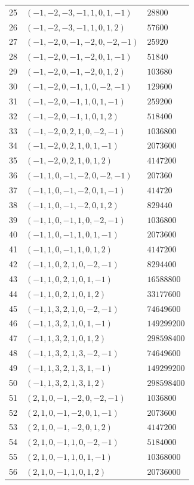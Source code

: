 \begin{longtable}{@{}rll@{}}
25 & $(-1,-2,-3,-1,1,0,1,-1)$ & $28800$\\
26 & $(-1,-2,-3,-1,1,0,1,2)$ & $57600$\\
27 & $(-1,-2,0,-1,-2,0,-2,-1)$ & $25920$\\
28 & $(-1,-2,0,-1,-2,0,1,-1)$ & $51840$\\
29 & $(-1,-2,0,-1,-2,0,1,2)$ & $103680$\\
30 & $(-1,-2,0,-1,1,0,-2,-1)$ & $129600$\\
31 & $(-1,-2,0,-1,1,0,1,-1)$ & $259200$\\
32 & $(-1,-2,0,-1,1,0,1,2)$ & $518400$\\
33 & $(-1,-2,0,2,1,0,-2,-1)$ & $1036800$\\
34 & $(-1,-2,0,2,1,0,1,-1)$ & $2073600$\\
35 & $(-1,-2,0,2,1,0,1,2)$ & $4147200$\\
36 & $(-1,1,0,-1,-2,0,-2,-1)$ & $207360$\\
37 & $(-1,1,0,-1,-2,0,1,-1)$ & $414720$\\
38 & $(-1,1,0,-1,-2,0,1,2)$ & $829440$\\
39 & $(-1,1,0,-1,1,0,-2,-1)$ & $1036800$\\
40 & $(-1,1,0,-1,1,0,1,-1)$ & $2073600$\\
41 & $(-1,1,0,-1,1,0,1,2)$ & $4147200$\\
42 & $(-1,1,0,2,1,0,-2,-1)$ & $8294400$\\
43 & $(-1,1,0,2,1,0,1,-1)$ & $16588800$\\
44 & $(-1,1,0,2,1,0,1,2)$ & $33177600$\\
45 & $(-1,1,3,2,1,0,-2,-1)$ & $74649600$\\
46 & $(-1,1,3,2,1,0,1,-1)$ & $149299200$\\
47 & $(-1,1,3,2,1,0,1,2)$ & $298598400$\\
48 & $(-1,1,3,2,1,3,-2,-1)$ & $74649600$\\
49 & $(-1,1,3,2,1,3,1,-1)$ & $149299200$\\
50 & $(-1,1,3,2,1,3,1,2)$ & $298598400$\\
51 & $(2,1,0,-1,-2,0,-2,-1)$ & $1036800$\\
52 & $(2,1,0,-1,-2,0,1,-1)$ & $2073600$\\
53 & $(2,1,0,-1,-2,0,1,2)$ & $4147200$\\
54 & $(2,1,0,-1,1,0,-2,-1)$ & $5184000$\\
55 & $(2,1,0,-1,1,0,1,-1)$ & $10368000$\\
56 & $(2,1,0,-1,1,0,1,2)$ & $20736000$\\

\end{longtable}
